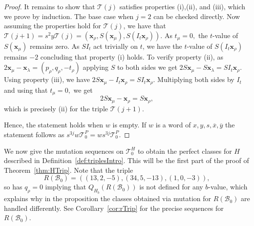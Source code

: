 \documentclass[11pt, reqno]{amsart}
\theoremstyle{remark}
\numberwithin{equation}{subsection}
\numberwithin{figure}{section}
\theoremstyle{customremark}
\newcommand{\Tt}{\mathcal{T}}
\newcommand{\ov}{\overline}
\newcommand{\la}{{\lambda}}
\begin{document}
\begin{proof}
It remains to show that $\Tt(j)$ satisfies properties (i),(ii), and (iii), which we prove by induction. The base case when $j=2$ can be checked directly. Now assuming the properties hold for $\Tt(j)$, we have that $\Tt(j+1)=s^2y\Tt(j)=(\bm{x}_\rho,S(\bm{x}_\mu),S(I_t\bm{x}_\rho)).$ As $t_\mu=0,$ the $t$-value of $S(\bm{x}_\mu)$ remains zero. As $SI_t$ act trivially on $t$, we have the $t$-value of $S(I_t\bm{x}_\rho)$ remains $-2$ concluding that property (i) holds. To verify property (ii), as $2\bm{x}_\mu-\bm{x}_\la=(p_\rho,q_\rho,-t_\rho)$ applying $S$ to both sides we get
    $2S\bm{x}_\mu-S\bm{x}_\la=SI_t\bm{x}_\rho.$ Using property (iii), we have 
    $2S\bm{x}_\mu-I_t\bm{x}_\rho=SI_t\bm{x}_\rho$. 
    Multiplying both sides by $I_t$ and using that $t_\mu=0,$ we get
    \[ 2S\bm{x}_\mu-\bm{x}_\rho=S\bm{x}_\rho,\]
    which is precisely (ii) for the triple $\Tt(j+1).$
    
     Hence, the statement holds when $w$ is empty. If $w$ is a word of $x,y,s,\ov{x}, \ov{y}$ the statement follows as $ s^{3j}w\Tt_0^P=ws^{3j}\Tt_0^P$. 
   
\end{proof}
We now give the mutation sequences on $\Tt_0^H$ to obtain the perfect classes for $H$ described in Definition~\ref{def:triplesIntro}. This will be the first part of the proof of Theorem~\ref{thm:HTrip}. Note that the triple
\[R(\mathcal{B}_0) =((13,2,-5),(34,5,-13),(1,0,-3)),\]
so has $q_\rho=0$ implying that $Q_{H_b}(R(\mathcal{B}_0))$ is not defined for any $b$-value, which explains why in the proposition the classes obtained via mutation for $R(\mathcal{B}_0)$ are handled differently. See Corollary~\ref{cor:rTrip} for the precise sequences for $R(\mathcal{B}_0).$
\end{document}
